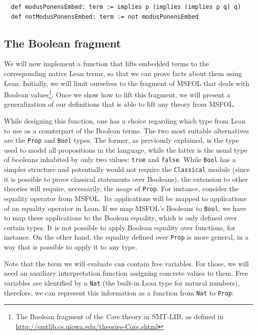 \begin{verbatim}
  def modusPonensEmbed: term := implies p (implies (implies p q) q)
  def notModusPonensEmbed: term := not modusPonensEmbed
\end{verbatim}


\subsection{The Boolean fragment}

We will now implement a function that lifts embedded terms to the corresponding
native Lean terms, so that we can prove facts about them using Lean.
Initially, we will limit ourselves to the fragment of MSFOL that
deals with Boolean values\footnote{The Boolean fragment of the
\emph{Core} theory in SMT-LIB, as defined in
\url{http://smtlib.cs.uiowa.edu/theories-Core.shtml}}. Once
we show how to lift this fragment, we will present a generalization
of our definitions that is able to lift any theory from MSFOL.

While designing this function, one has a
choice regarding which type from Lean to use as a counterpart of the Boolean terms. The two
most suitable alternatives are the \texttt{Prop} and \texttt{Bool} types. The former, as
previously explained, is the type used to model all propositions in the language, while
the latter is the usual type of booleans inhabited by only two values: \texttt{true} and
\texttt{false}. While \texttt{Bool} has a simpler structure and potentially would not
require the \texttt{Classical} module (since it is possible to prove classical statements over Booleans),
the extension to other theories will require, necessarily, the usage of \texttt{Prop}. For instance,
consider the equality operator from MSFOL.\ Its applications will be mapped to applications of an equality operator
in Lean. If we map MSFOL's Booleans to \texttt{Bool}, we have to map these applications to the
Boolean equality, which is only defined over certain types. It is not possible
to apply Boolean equality over functions, for instance. On the other hand, the equality
defined over \texttt{Prop} is more general, in a way that is possible to apply it to any type.

Note that the term we will evaluate can contain free variables. For those, we will need an auxiliary interpretation function assigning concrete values to them.
Free variables are
identified by a \texttt{Nat} (the built-in Lean type for natural numbers), therefore, we can
represent this information as a function from \texttt{Nat} to
\texttt{Prop}:


